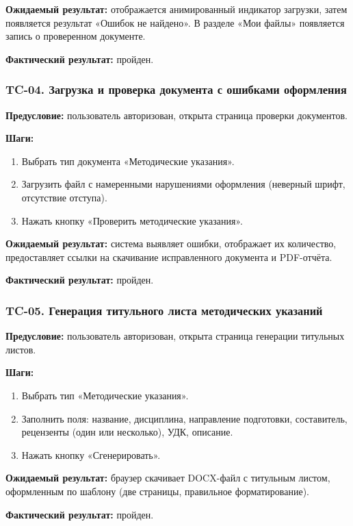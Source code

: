 \textbf{Ожидаемый результат:} отображается анимированный индикатор загрузки, затем появляется результат «Ошибок не найдено». В разделе «Мои файлы» появляется запись о проверенном документе.

\textbf{Фактический результат:} пройден.

\subsubsection{TC-04. Загрузка и проверка документа с ошибками оформления}

\textbf{Предусловие:} пользователь авторизован, открыта страница проверки документов.

\textbf{Шаги:}
\begin{enumerate}
	\item Выбрать тип документа «Методические указания».
	\item Загрузить файл с намеренными нарушениями оформления (неверный шрифт, отсутствие отступа).
	\item Нажать кнопку «Проверить методические указания».
\end{enumerate}

\textbf{Ожидаемый результат:} система выявляет ошибки, отображает их количество, предоставляет ссылки на скачивание исправленного документа и PDF-отчёта.

\textbf{Фактический результат:} пройден.

\subsubsection{TC-05. Генерация титульного листа методических указаний}

\textbf{Предусловие:} пользователь авторизован, открыта страница генерации титульных листов.

\textbf{Шаги:}
\begin{enumerate}
	\item Выбрать тип «Методические указания».
	\item Заполнить поля: название, дисциплина, направление подготовки, составитель, рецензенты (один или несколько), УДК, описание.
	\item Нажать кнопку «Сгенерировать».
\end{enumerate}

\textbf{Ожидаемый результат:} браузер скачивает DOCX-файл с титульным листом, оформленным по шаблону (две страницы, правильное форматирование).

\textbf{Фактический результат:} пройден.

